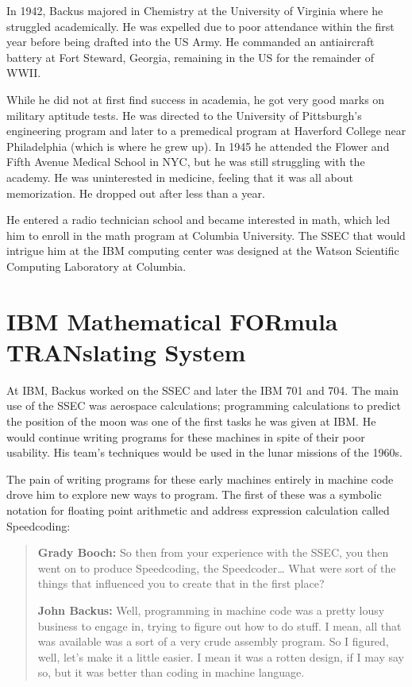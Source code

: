 In 1942, Backus majored in Chemistry at the University of Virginia where he 
struggled academically. He was expelled due to poor attendance within the first 
year before being drafted into the US Army.
He commanded an antiaircraft battery at Fort Steward, Georgia, remaining in the 
US for the remainder of WWII.

While he did not at first find success in academia, he got very good marks on 
military aptitude tests. He was directed to the University of Pittsburgh's 
engineering program and later to a premedical program at Haverford College near 
Philadelphia (which is where he grew up). In 1945 he attended the Flower and 
Fifth Avenue Medical School in NYC, but he was still struggling with the 
academy.
He was uninterested in medicine, feeling that it was all about memorization. He 
dropped out after less than a year.

He entered a radio technician school and became interested in math, which led 
him to enroll in the math program at Columbia University. The SSEC that would 
intrigue him at the IBM computing center was designed at the Watson Scientific 
Computing Laboratory at Columbia.

\section{IBM Mathematical FORmula TRANslating System}

At IBM, Backus worked on the SSEC and later the IBM 701 and 704.
The main use of the SSEC was aerospace calculations;
programming calculations to predict the position of the moon was
one of the first tasks he was given at IBM.
He would continue writing programs for these machines in spite of their
poor usability.
His team's techniques would be used in the lunar missions of the 1960s.

The pain of writing programs for these early machines entirely in machine code
drove him to explore new ways to program.
The first of these was a symbolic notation for floating point arithmetic
and address expression calculation called Speedcoding\cite{backus_oral_history_2006}:

\begin{quotation}
    \textbf{Grady Booch:}
    So then from your experience with the SSEC, you then went on to produce Speedcoding, the
    Speedcoder\dots
    What were sort of the things that influenced you to create that in the first place? 

    \textbf{John Backus:}
    Well, programming in machine code was a pretty lousy business to engage in, trying to figure
    out how to do stuff. I mean, all that was available was a sort of a very crude assembly program. So I
    figured, well, let's make it a little easier. I mean it was a rotten design, if I may say so, but it was better
    than coding in machine language. 
\end{quotation}

